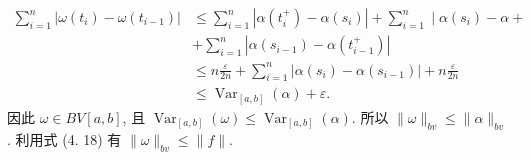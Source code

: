 \documentclass[openany]{ctexbook}
\makeatletter
\theoremstyle{kaiti}
\theoremstyle{normal}
\renewenvironment{proof}[1][\proofname]{\par
    \pushQED{\qed}%
    \normalfont \topsep6\p@\@plus6\p@\relax
    \trivlist
    \item\relax
    {\heiti #1}\hspace{2\labelsep}\ignorespaces
  }{%
    \popQED\endtrivlist\@endpefalse
  }
\makeatother
\begin{document}
\begin{proof}
$$\begin{aligned}
\sum_{i=1}^n\left|\omega\left(t_{i}\right)-\omega\left(t_{i-1}\right)\right| &\leqslant \sum_{i=1}^n\left|\alpha\left(t_{i}^{+}\right)-\alpha\left(s_{i}\right)\right|+\sum_{i=1}^n \mid \alpha\left(s_{i}\right)-\alpha+\\
&+\sum_{i=1}^n\left|\alpha\left(s_{i-1}\right)-\alpha\left(t_{i-1}^{+}\right)\right| \\
& \leqslant n \frac{\varepsilon}{2 n}+\sum_{i=1}^n\left|\alpha\left(s_{i}\right)-\alpha\left(s_{i-1}\right)\right|+n \frac{\varepsilon}{2 n} \\
& \leqslant \operatorname{Var}_{[a, b]}(\alpha)+\varepsilon.
\end{aligned}
$$
因此 $\omega \in B V[a, b]$, 且 $\operatorname{Var}_{[a, b]}(\omega) \leqslant \operatorname{Var}_{[a, b]}(\alpha)$. 所以 $\|\omega\|_{b v} \leqslant\|\alpha\|_{b v}$. 利用式 (4. 18) 有 $\|\omega\|_{b v} \leqslant\|f\|.$


\end{proof}
\end{document}

